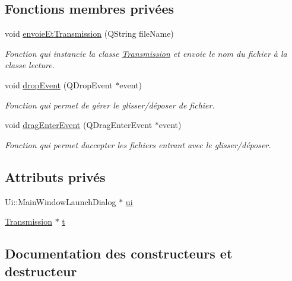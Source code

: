 \subsection*{Fonctions membres privées}
\begin{DoxyCompactItemize}
\item 
void \hyperlink{classMainWindowLaunchDialog_a8425a23d4ed5ab00f471a1f295e72143}{envoie\+Et\+Transmission} (Q\+String file\+Name)
\begin{DoxyCompactList}\small\item\em Fonction qui instancie la classe \hyperlink{classTransmission}{Transmission} et envoie le nom du fichier à la classe lecture. \end{DoxyCompactList}\item 
void \hyperlink{classMainWindowLaunchDialog_a6b292183d418fe79b79225d9a35bd3dd}{drop\+Event} (Q\+Drop\+Event $\ast$event)
\begin{DoxyCompactList}\small\item\em Fonction qui permet de gérer le glisser/déposer de fichier. \end{DoxyCompactList}\item 
void \hyperlink{classMainWindowLaunchDialog_aaf393173ffd6c63b2c4d5bdd48b8ddb4}{drag\+Enter\+Event} (Q\+Drag\+Enter\+Event $\ast$event)
\begin{DoxyCompactList}\small\item\em Fonction qui permet d\textquotesingle{}accepter les fichiers entrant avec le glisser/déposer. \end{DoxyCompactList}\end{DoxyCompactItemize}
\subsection*{Attributs privés}
\begin{DoxyCompactItemize}
\item 
Ui\+::\+Main\+Window\+Launch\+Dialog $\ast$ \hyperlink{classMainWindowLaunchDialog_ab79dbe386d19b41840ab6489ed73cacf}{ui}
\item 
\hyperlink{classTransmission}{Transmission} $\ast$ \hyperlink{classMainWindowLaunchDialog_a99241b2f7c2317788d83716301f33b1c}{t}
\end{DoxyCompactItemize}


\subsection{Documentation des constructeurs et destructeur}
\mbox{\label{classMainWindowLaunchDialog_a9f7ef6d5da5eff43adb6ea835f0790d0}} 
